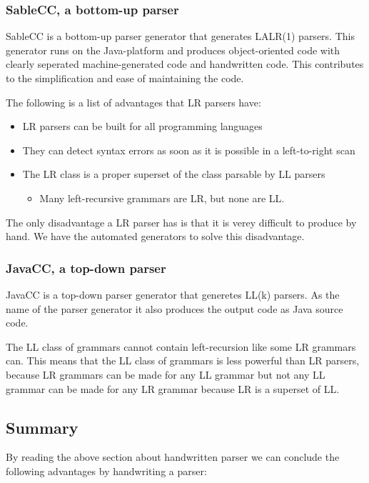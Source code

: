 \subsubsection{SableCC, a bottom-up parser}
\label{sec:ana-sablecc}
SableCC is a bottom-up parser generator that generates LALR(1) parsers. This generator runs on the Java-platform and produces object-oriented code with clearly seperated machine-generated code and handwritten code. This contributes to the simplification and ease of maintaining the code.\cite[pp. 11]{sableccdoc}

The following is a list of advantages that LR parsers have:\cite[pp. 193]{sebesta2013} 

\begin{itemize}[noitemsep]
\item LR parsers can be built for all programming languages
\item They can detect syntax errors as soon as it is possible in a left-to-right scan
\item The LR class is a proper superset of the class parsable by LL parsers
\begin{itemize}[noitemsep]
\item Many left-recursive grammars are LR, but none are LL.
\end{itemize}
\end{itemize}

The only disadvantage a LR parser has is that it is verey difficult to produce by hand. We have the automated generators to solve this disadvantage.\cite[pp. 193]{sebesta2013}

\subsubsection{JavaCC, a top-down parser}
\label{sec:ana-javacc}
JavaCC is a top-down parser generator that generetes LL(k) parsers. As the name of the parser generator it also produces the output code as Java source code.\cite{wiki-javacc}

The LL class of grammars cannot contain left-recursion like some LR grammars can. This means that the LL class of grammars is less powerful than LR parsers, because LR grammars can be made for any LL grammar but not any LL grammar can be made for any LR grammar because LR is a superset of LL.

\subsection{Summary}
\label{sec:ana-parsersum}
By reading the above section about handwritten parser we can conclude the following advantages by handwriting a parser:

